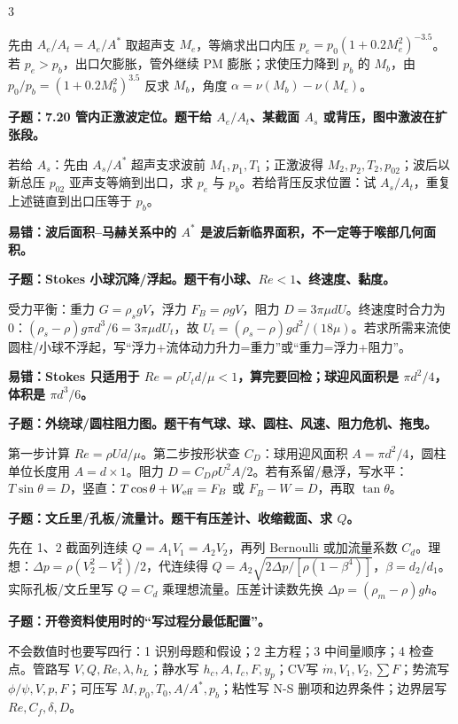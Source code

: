 \documentclass[a4paper]{article}
\newcommand{\qt}[1]{\vspace{0.04pt}\colorbox{Q}{\parbox{\dimexpr\linewidth-2\fboxsep}{\color{white}\bfseries #1}}\par}
\newcommand{\ans}[1]{\colorbox{G}{\parbox{\dimexpr\linewidth-2\fboxsep}{#1}}\par}
\newcommand{\warn}[1]{\colorbox{Y}{\parbox{\dimexpr\linewidth-2\fboxsep}{\color{E}\bfseries #1}}\par}
\begin{document}
\begin{multicols}{3}
\ans{先由 $A_e/A_t=A_e/A^*$ 取超声支 $M_e$，等熵求出口内压 $p_e=p_0(1+0.2M_e^2)^{-3.5}$。若 $p_e>p_b$，出口欠膨胀，管外继续 PM 膨胀；求使压力降到 $p_b$ 的 $M_b$，由 $p_0/p_b=(1+0.2M_b^2)^{3.5}$ 反求 $M_b$，角度 $\alpha=\nu(M_b)-\nu(M_e)$。}
\qt{子题：7.20 管内正激波定位。题干给 $A_e/A_t$、某截面 $A_s$ 或背压，图中激波在扩张段。}
\ans{若给 $A_s$：先由 $A_s/A^*$ 超声支求波前 $M_1,p_1,T_1$；正激波得 $M_2,p_2,T_2,p_{02}$；波后以新总压 $p_{02}$ 亚声支等熵到出口，求 $p_e$ 与 $p_b$。若给背压反求位置：试 $A_s/A_t$，重复上述链直到出口压等于 $p_b$。}
\warn{易错：波后面积--马赫关系中的 $A^*$ 是波后新临界面积，不一定等于喉部几何面积。}
\qt{子题：Stokes 小球沉降/浮起。题干有小球、$Re<1$、终速度、黏度。}
\ans{受力平衡：重力 $G=\rho_s gV$，浮力 $F_B=\rho gV$，阻力 $D=3\pi\mu dU$。终速度时合力为0：$(\rho_s-\rho)g\pi d^3/6=3\pi\mu dU_t$，故 $U_t=(\rho_s-\rho)gd^2/(18\mu)$。若求所需来流使圆柱/小球不浮起，写“浮力+流体动力升力=重力”或“重力=浮力+阻力”。}
\warn{易错：Stokes 只适用于 $Re=\rho U_td/\mu<1$，算完要回检；球迎风面积是 $\pi d^2/4$，体积是 $\pi d^3/6$。}
\qt{子题：外绕球/圆柱阻力图。题干有气球、球、圆柱、风速、阻力危机、拖曳。}
\ans{第一步计算 $Re=\rho Ud/\mu$。第二步按形状查 $C_D$：球用迎风面积 $A=\pi d^2/4$，圆柱单位长度用 $A=d\times1$。阻力 $D=C_D\rho U^2A/2$。若有系留/悬浮，写水平：$T\sin\theta=D$，竖直：$T\cos\theta+W_{\rm eff}=F_B$ 或 $F_B-W=D$，再取 $\tan\theta$。}
\qt{子题：文丘里/孔板/流量计。题干有压差计、收缩截面、求 $Q$。}
\ans{先在 1、2 截面列连续 $Q=A_1V_1=A_2V_2$，再列 Bernoulli 或加流量系数 $C_d$。理想：$\Delta p=\rho(V_2^2-V_1^2)/2$，代连续得 $Q=A_2\sqrt{2\Delta p/[\rho(1-\beta^4)]}$，$\beta=d_2/d_1$。实际孔板/文丘里写 $Q=C_d$ 乘理想流量。压差计读数先换 $\Delta p=(\rho_m-\rho)gh$。}
\qt{子题：开卷资料使用时的“写过程分最低配置”。}
\ans{不会数值时也要写四行：1 识别母题和假设；2 主方程；3 中间量顺序；4 检查点。管路写 $V,Q,Re,\lambda,h_L$；静水写 $h_c,A,I_c,F,y_p$；CV写 $\dot m,V_1,V_2,\sum F$；势流写 $\phi/\psi,V,p,F$；可压写 $M,p_0,T_0,A/A^*,p_b$；粘性写 N-S 删项和边界条件；边界层写 $Re,C_f,\delta,D$。}


\end{multicols}
\end{document}
